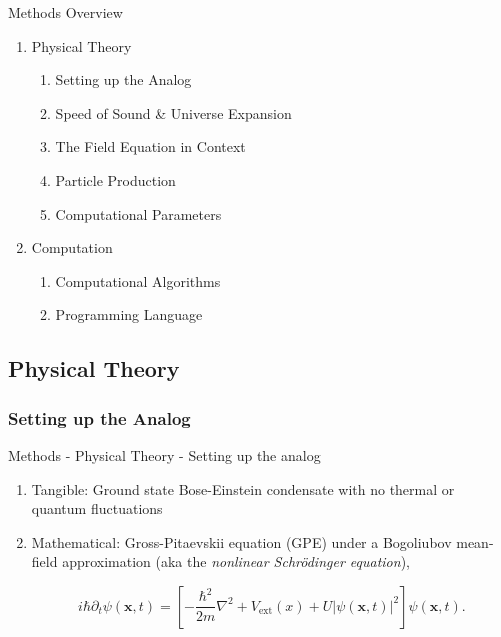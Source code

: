 \documentclass[aspectratio=169]{beamer}
\begin{document}
    \begin{frame}{Methods Overview}
        \begin{enumerate}
            \item Physical Theory
                \begin{enumerate}
                    \item Setting up the Analog
                    \item Speed of Sound \& Universe Expansion
                    \item The Field Equation in Context
                    \item Particle Production
                    \item Computational Parameters
                \end{enumerate}
            \item Computation
                \begin{enumerate}
                    \item Computational Algorithms
                    \item Programming Language
                \end{enumerate}
        \end{enumerate}
    \end{frame}

    \subsection{Physical Theory}

        \subsubsection{Setting up the Analog}

            \begin{frame}{Methods - Physical Theory - Setting up the analog}
                \begin{enumerate}
                    \item Tangible: Ground state Bose-Einstein condensate with no thermal or quantum fluctuations
                    \item Mathematical: Gross-Pitaevskii equation (GPE) under a Bogoliubov mean-field approximation (aka the \textit{nonlinear Schr{\"o}dinger equation}),
                        
                        \begin{equation} \label{eq:GPE}
                            i \hbar \partial_t \psi(\mathbf{x}, t) = \left[ -\frac{\hbar^2}{2 m} \nabla^2 + V_\text{ext}(x) + U \left| \psi(\mathbf{x}, t) \right|^2 \right] \psi(\mathbf{x}, t).
                        \end{equation}
                \end{enumerate}
            \end{frame}
        
\end{document}
